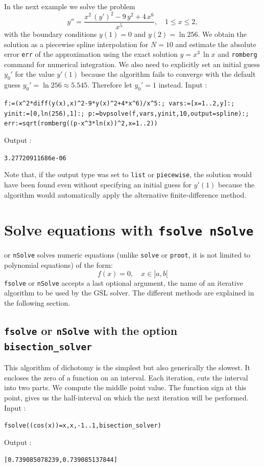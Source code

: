 \documentclass[a4paper,11pt]{book}
\begin{document}
In the next example we solve the problem
\[ y''=\frac{x^2\,(y')^2-9\,y^2+4\,x^6}{x^5},\quad 1\leq x\leq 2, \]
with the boundary conditions $y(1)=0$ and $y(2)=\ln 256$. We obtain the solution as a piecewise spline interpolation for $N=10$ and estimate the absolute error {\tt err} of the approximation using the exact solution $y=x^3\,\ln x$ and {\tt romberg} command for numerical integration. We also need to explicitly set an initial guess $y_0'$ for the value $y'(1)$ because the algorithm fails to converge with the default guess $y_0'=\ln 256\approx 5.545$. Therefore let $y_0'=1$ instead. Input :
\begin{center}
  \tt f:=(x\verb|^|2*diff(y(x),x)\verb|^|2-9*y(x)\verb|^|2+4*x\verb|^|6)/x\verb|^|5:; vars:=[x=1..2,y]:; yinit:=[0,ln(256),1]:; p:=bvpsolve(f,vars,yinit,10,output=spline):; err:=sqrt(romberg((p-x\verb|^|3*ln(x))\verb|^|2,x=1..2))
\end{center}
Output :
\begin{center}
  \tt 3.27720911686e-06
\end{center}
Note that, if the output type was set to {\tt list} or {\tt piecewise}, the solution would have been found even without specifying an initial guess for $y'(1)$ because the algorithm would automatically apply the alternative finite-difference method.

\section{Solve equations with {\tt fsolve nSolve}}
 or {\tt nSolve} solves numeric equations
(unlike {\tt solve} or {\tt proot}, it is not limited to polynomial 
equations) of the form:
\[ f(x)=0, \quad x \in ]a,b[ \]
{\tt fsolve} or {\tt nSolve} accepts a last optional argument,
the name of an iterative algorithm to be used by the GSL solver.
The different methods are explained in the following section.

\subsection{{\tt fsolve} or {\tt nSolve} with the option {\tt bisection\_solver}}
This algorithm of dichotomy is the simplest but also generically
the slowest. 
It encloses the zero of a function on an interval. 
Each iteration, cuts the interval into two parts. We compute the middle point 
value. The function sign at this point, gives us the half-interval 
on which the next iteration will be performed.\\
Input :
\begin{center}{\tt fsolve((cos(x))=x,x,-1..1,bisection\_solver)}\end{center}
Output :
\begin{center}{\tt [0.739085078239,0.739085137844]}\end{center}
\end{document}
